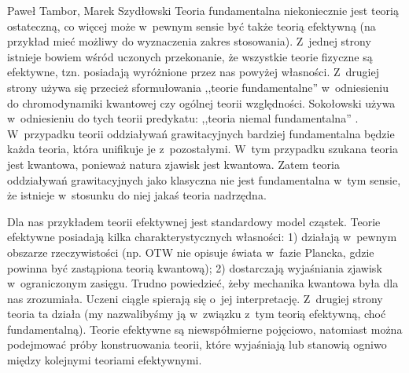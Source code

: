 \begin{artplenv}{Paweł Tambor, Marek Szydłowski}
Teoria fundamentalna niekoniecznie jest teorią ostateczną, co więcej może w~pewnym sensie być także teorią efektywną (na przykład mieć możliwy do wyznaczenia zakres stosowania). Z~jednej strony istnieje bowiem wśród uczonych przekonanie, że wszystkie teorie fizyczne są efektywne, tzn. posiadają wyróżnione przez nas powyżej własności. Z~drugiej strony używa się przecież sformułowania ,,teorie fundamentalne'' w~odniesieniu do chromodynamiki kwantowej czy ogólnej teorii względności. Sokołowski używa w~odniesieniu do tych teorii predykatu: ,,teoria niemal fundamentalna''
\parencite[][s.~122]{sokolowski_teorie_2006}. %
 W~przypadku teorii oddziaływań grawitacyjnych bardziej fundamentalna będzie każda teoria, która unifikuje je z~pozostałymi. W~tym przypadku szukana teoria jest kwantowa, ponieważ natura zjawisk jest kwantowa. Zatem teoria oddziaływań grawitacyjnych jako klasyczna nie jest fundamentalna w~tym sensie, że istnieje w~stosunku do niej jakaś teoria nadrzędna.

Dla nas przykładem teorii efektywnej jest standardowy model cząstek. Teorie efektywne posiadają kilka charakterystycznych własności: 1) działają w~pewnym obszarze rzeczywistości (np. OTW nie opisuje świata w~fazie Plancka, gdzie powinna być zastąpiona teorią kwantową); 2) dostarczają wyjaśniania zjawisk w~ograniczonym zasięgu. Trudno powiedzieć, żeby mechanika kwantowa była dla nas zrozumiała. Uczeni ciągle spierają się o~jej interpretację. Z~drugiej strony teoria ta działa (my nazwalibyśmy ją w~związku z~tym teorią efektywną, choć fundamentalną). Teorie efektywne są niewspółmierne pojęciowo, natomiast można podejmować próby konstruowania teorii, które wyjaśniają lub stanowią ogniwo między kolejnymi teoriami efektywnymi.


\end{artplenv}

